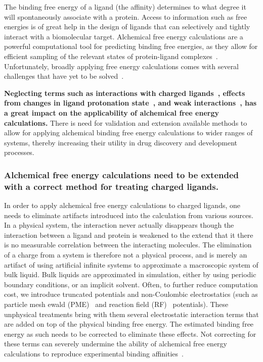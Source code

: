 \documentclass[10pt,final]{article}
\begin{document}
The binding free energy of a ligand (the affinity) determines to what degree it will spontaneously associate with a protein.
%
Access to information such as free energies is of great help in the design of ligands that can selectively and tightly interact with a biomolecular target.
%
Alchemical free energy calculations are a powerful computational tool for predicting binding free energies, as they allow for efficient sampling of the relevant states of protein-ligand complexes~\autocite{Shirts2007a}.
%
Unfortunately, broadly applying free energy calculations comes with several challenges that have yet to be solved~\autocite{Chodera2011a,Gapsys2015a}. 

%
\textbf{Neglecting terms such as interactions with charged ligands~\autocite{Rocklin2013b,Muddana2014a},
effects from changes in ligand protonation state~\autocite{Dullweber2001a,Aleksandrov2007a,Czodrowski2007a,Steuber2007a,Czodrowski2007b},
and weak interactions~\autocite{Gilson1997a}, has a great impact on the applicability of alchemical free energy calculations.
}%
There is need for validation  and extension available methods to allow for applying alchemical binding free energy calculations to wider ranges of systems,
thereby increasing their utility in drug discovery and development processes.


\subsubsection*{Alchemical free energy calculations need to be extended with a correct method for treating charged ligands.}
In order to apply alchemical free energy calculations to charged ligands, one needs to eliminate artifacts introduced into the calculation from various sources.
%
In a physical system, the interaction never actually disappears though the interaction between a ligand and protein is weakened to the extend that it there is no measurable correlation between the interacting molecules.
%
The elimination of a charge from a system is therefore not a physical process, and is merely an artifact of using artificial infinite systems to approximate a macroscopic system of bulk liquid.
%
Bulk liquids are approximated in simulation, either by using periodic boundary conditions, or an implicit solvent.
%
Often, to further reduce computation cost, we introduce truncated potentials and non-Coulombic electrostatics (such as particle mesh ewald (PME)~\autocite{Essmann1995a} and reaction field (RF)~\autocite{Tironi1995a} potentials). 
%
These unphysical treatments bring with them several electrostatic interaction terms that are added on top of the physical binding free energy.
%
The estimated binding free energy as such needs to be corrected to eliminate these effects.
%
Not correcting for these terms can severely undermine the ability of alchemical free energy calculations to reproduce experimental binding affinities~\autocite{Rocklin2013b,Muddana2014a}.
\end{document}
